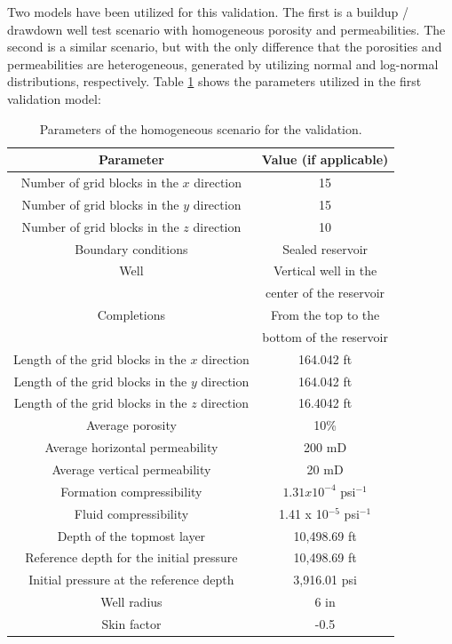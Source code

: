 Two models have been utilized for this validation. The first is a buildup / drawdown well test scenario with homogeneous porosity and permeabilities. The second is a similar scenario, but with the only difference that the porosities and permeabilities are heterogeneous, generated by utilizing normal and log-normal distributions, respectively. Table \ref{tbl:2} shows the parameters utilized in the first validation model:

\begin{table}[htbp]
	\centering
	\caption{Parameters of the homogeneous scenario for the validation.}
	\label{tbl:2}
	\begin{tabular}{c c}
		\toprule
		Parameter & Value (if applicable)\\
		\midrule
		Number of grid blocks in the $x$ direction & 15\\
		Number of grid blocks in the $y$ direction & 15\\
		Number of grid blocks in the $z$ direction & 10\\
		Boundary conditions & Sealed reservoir \\
		Well & Vertical well in the\\
		& center of the reservoir\\
		Completions & From the top to the\\
		& bottom of the reservoir\\
		Length of the grid blocks in the $x$ direction & 164.042 ft\\
		Length of the grid blocks in the $y$ direction & 164.042 ft\\
		Length of the grid blocks in the $z$ direction & 16.4042 ft\\
		Average porosity & 10\%\\
		Average horizontal permeability & 200 mD\\
		Average vertical permeability & 20 mD\\
		Formation compressibility & $1.31 x 10^{-4}$ psi$^{-1}$\\
		Fluid compressibility &  1.41 x 10$^{-5}$ psi$^{-1}$\\
		Depth of the topmost layer & 10,498.69 ft\\
		Reference depth for the initial pressure & 10,498.69 ft\\
		Initial pressure at the reference depth & 3,916.01 psi\\
		Well radius & 6 in\\
		Skin factor & -0.5\\
		\bottomrule
	\end{tabular}
\end{table}

